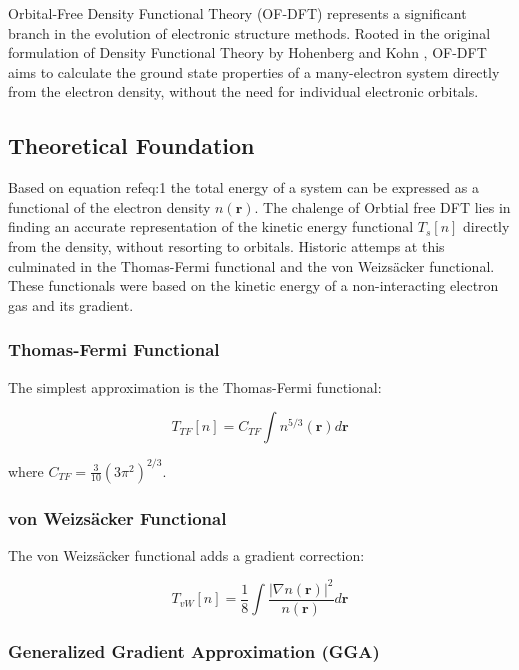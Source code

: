 Orbital-Free Density Functional Theory (OF-DFT) represents a significant branch in the evolution of electronic structure methods. Rooted in the original formulation of Density Functional Theory by Hohenberg and Kohn \cite{HohenbergKohn1964}, OF-DFT aims to calculate the ground state properties of a many-electron system directly from the electron density, without the need for individual electronic orbitals.
\subsection{Theoretical Foundation}

Based on equation ref{eq:1} the total energy of a system can be expressed as a functional of the electron density $n(\mathbf{r})$. The chalenge of Orbtial free DFT lies in finding an accurate representation of the kinetic energy functional $T_s[n]$ directly from the density, without resorting to orbitals. Historic attemps at this culminated in the Thomas-Fermi functional and the von Weizsäcker functional. These functionals were based on the kinetic energy of a non-interacting electron gas and its gradient.

\subsubsection{Thomas-Fermi Functional}

The simplest approximation is the Thomas-Fermi functional:

\begin{equation}
T_{TF}[n] = C_{TF} \int n^{5/3}(\mathbf{r}) d\mathbf{r}
\end{equation}

where $C_{TF} = \frac{3}{10}(3\pi^2)^{2/3}$.

\subsubsection{von Weizsäcker Functional}

The von Weizsäcker functional adds a gradient correction:

\begin{equation}
T_{vW}[n] = \frac{1}{8} \int \frac{|\nabla n(\mathbf{r})|^2}{n(\mathbf{r})} d\mathbf{r}
\end{equation}

\subsubsection{Generalized Gradient Approximation (GGA)}

